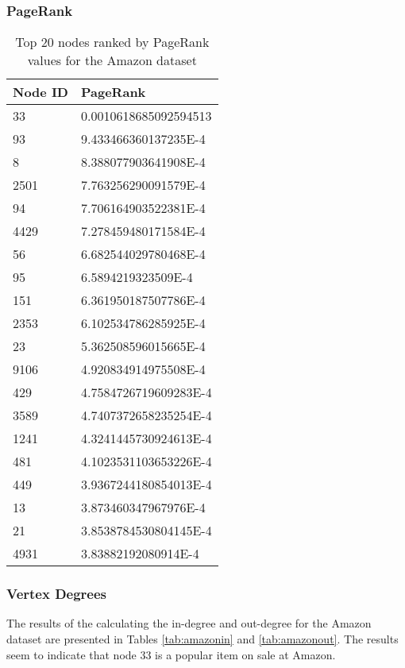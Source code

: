 \subsubsection{PageRank}

\begin{table}%
\centering
\begin{tabular}{|l|l|}
\hline
Node ID & PageRank \\
\hline
33 & 0.0010618685092594513 \\
93 & 9.433466360137235E-4 \\
8 & 8.388077903641908E-4 \\
2501 & 7.763256290091579E-4 \\
94 & 7.706164903522381E-4 \\
4429 & 7.278459480171584E-4 \\
56 & 6.682544029780468E-4 \\
95 & 6.5894219323509E-4 \\
151 & 6.361950187507786E-4 \\
2353 & 6.102534786285925E-4 \\
23 & 5.362508596015665E-4 \\
9106 & 4.920834914975508E-4 \\
429 & 4.7584726719609283E-4 \\
3589 & 4.7407372658235254E-4 \\
1241 & 4.3241445730924613E-4 \\
481 & 4.1023531103653226E-4 \\
449 & 3.9367244180854013E-4 \\
13 & 3.873460347967976E-4 \\
21 & 3.8538784530804145E-4 \\
4931 & 3.83882192080914E-4 \\
\hline
\end{tabular}
\caption{Top 20 nodes ranked by PageRank values for the Amazon dataset}
\label{tab:amazonpr}
\end{table}

\subsubsection{Vertex Degrees}
The results of the calculating the in-degree and out-degree for the Amazon dataset are presented in Tables \ref{tab:amazonin} and \ref{tab:amazonout}. The results seem to indicate that node 33 is a popular item on sale at Amazon.

